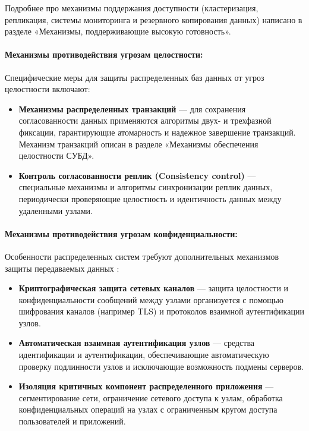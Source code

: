 Подробнее про механизмы поддержания доступности (кластеризация, репликация, системы мониторинга и резервного копирования данных) написано в разделе «Механизмы, поддерживающие высокую готовность».

\paragraph{Механизмы противодействия угрозам целостности:}

Специфические меры для защиты распределенных баз данных от угроз целостности включают:

\begin{itemize} 
    \item \textbf{Механизмы распределенных транзакций} — для сохранения согласованности данных применяются алгоритмы двух- и трехфазной фиксации, гарантирующие атомарность и надежное завершение транзакций. Механизм транзакций описан в разделе «Механизмы обеспечения целостности СУБД».
    \item \textbf{Контроль согласованности реплик (Consistency control)} — специальные механизмы и алгоритмы синхронизации реплик данных, периодически проверяющие целостность и идентичность данных между удаленными узлами.
\end{itemize}

\paragraph{Механизмы противодействия угрозам конфиденциальности:}

Особенности распределенных систем требуют дополнительных механизмов защиты передаваемых данных \autocite{Tanenbaum}:

\begin{itemize} 
    \item \textbf{Криптографическая защита сетевых каналов} — защита целостности и конфиденциальности сообщений между узлами организуется с помощью шифрования каналов (например TLS) и протоколов взаимной аутентификации узлов.
    \item \textbf{Автоматическая взаимная аутентификация узлов} — средства идентификации и аутентификации, обеспечивающие автоматическую проверку подлинности узлов и исключающие возможность подмены серверов.
    \item \textbf{Изоляция критичных компонент распределенного приложения} — сегментирование сети, ограничение сетевого доступа к узлам, обработка конфиденциальных операций на узлах с ограниченным кругом доступа пользователей и приложений.
\end{itemize}

